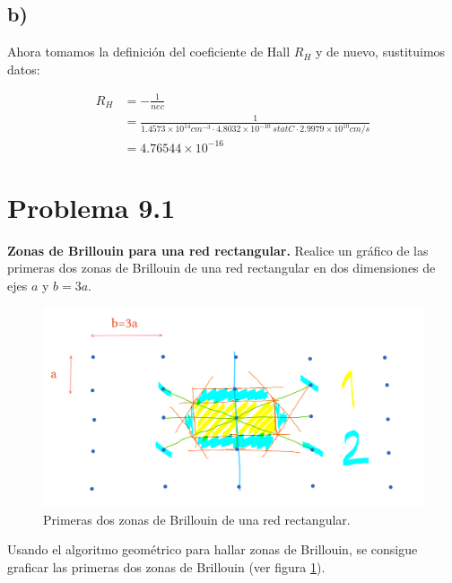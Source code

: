 \subsection{b)}

Ahora tomamos la definición del coeficiente de Hall $R_H$ y de nuevo, sustituimos datos:

\begin{align*}
    R_H &= -\frac{1}{nec}\\
        &=\frac{1}{1.4573\times 10^{14}cm^{-3} \cdot 4.8032\times 10^{-10}~ statC \cdot 2.9979\times 10^{10}cm/s}\\
        &= 4.76544\times 10^{-16}
\end{align*}


\section{Problema 9.1}
\textbf{Zonas de Brillouin para una red rectangular.} Realice un gráfico de las primeras dos zonas de Brillouin de una red rectangular en dos dimensiones de ejes $a$ y $b=3a$.

\begin{figure}[H]
    \centering
    \includegraphics[width = 0.8\linewidth]{Image.png}
    \caption{Primeras dos zonas de Brillouin de una red rectangular.}
    \label{fig:unique}
\end{figure}

Usando el algoritmo geométrico para hallar zonas de Brillouin, se consigue graficar las primeras dos zonas de Brillouin (ver figura \ref{fig:unique}).